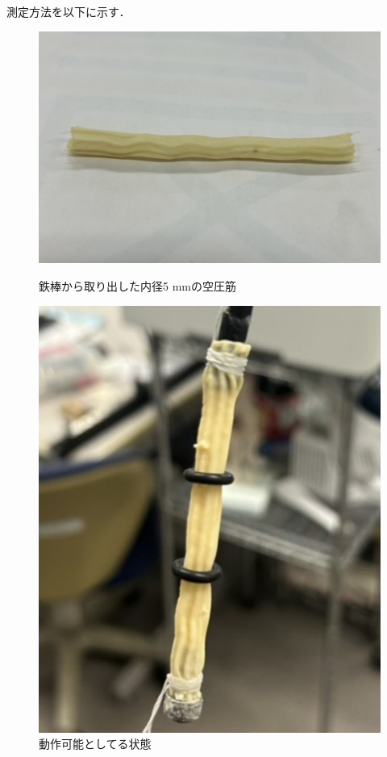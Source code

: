 測定方法を以下に示す．
\begin{figure}[t]
  \centering
  \begin{minipage}{0.59\hsize}
      \centering
      \includegraphics[scale=0.25]{pic/16.jpg}
      \caption{鉄棒から取り出した内径5 mmの空圧筋}
      \label{fig:16}
  \end{minipage} \hfill
  \begin{minipage}{0.39\hsize}
      \centering
      \includegraphics[scale=0.25]{pic/ww.jpg}
      \caption{動作可能としてる状態}
      \label{fig:17}
  \end{minipage} 
\end{figure}
